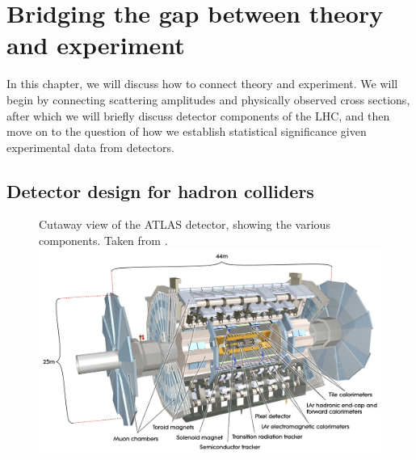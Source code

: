 \chapter{Bridging the gap between theory and experiment}
In this chapter, we will discuss how to connect theory and experiment. We will begin by connecting scattering amplitudes and physically observed cross sections, after which we will briefly discuss detector components of the LHC, and then move on to the question of how we establish statistical significance given experimental data from detectors.
\section{Detector design for hadron colliders}

\begin{figure}[h]
  \begin{sidecaption}
    { Cutaway view of the ATLAS detector, showing the various components. Taken from \citep{Atlas2008}.}
  \includegraphics[trim = {2cm 5cm 2cm 2cm}, clip, width=1\textwidth]{images/atlas}
  \end{sidecaption}
\end{figure}

